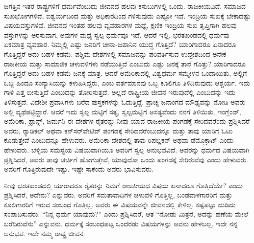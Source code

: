 \newpage

ಜಗತ್ತಿನ ಇತರ ರಾಷ್ಟ್ರಗಳಿಗೆ ಧರ್ಮವೆಂಬುದು ಜೀವನದ ಹಲವು ಕಸುಬುಗಳಲ್ಲಿ ಒಂದು. ರಾಜಕೀಯವಿದೆ, ಸಮಾಜದ ಸುಖಭೋಗಗಳಿವೆ, ಐಶ್ವರ್ಯದಿಂದ ಮತ್ತು ಅಧಿಕಾರದಿಂದ ಗಳಿಸುವುದು ಎಷ್ಟೋ ಇವೆ. ಇಂದ್ರಿಯ ಸುಖಕ್ಕೆ ಬೇಕಾದಷ್ಟು ವಿಷಯವಸ್ತುಗಳಿವೆ. ಜೀವನದ ಇಂತಹ ಹಲವು ವ್ಯವಹಾರಗಳ ಮಧ್ಯೆ, ಕ್ಷಣಿಕ ಇಂದ್ರಿಯ ಸುಖ ತೃಪ್ತಿಗಾಗಿ ಹಲವು ವಸ್ತುಗಳನ್ನು ಅರಸುವಾಗ, ಅವುಗಳ ಮಧ್ಯೆ ಸ್ವಲ್ಪ ಧರ್ಮವೂ ಇದೆ. ಆದರೆ ಇಲ್ಲಿ, ಭರತಖಂಡದಲ್ಲಿ ಧರ್ಮವು ಏಕಮಾತ್ರ ವ್ಯವಹಾರ. ನಿಮ್ಮಲ್ಲಿ ಎಷ್ಟು ಜನರಿಗೆ ಚೀನಾ-ಜಪಾನಿನ ಯುದ್ಧ ಗೊತ್ತಿದೆ? ಯಾರಿಗಾದರೂ ಏನಾದರೂ ಗೊತ್ತಿದ್ದರೆ ಅದು ಬಹಳ ಕಡಮೆ. ಪಶ್ಚಿಮ ದೇಶಗಳಲ್ಲಿ ಸಮಾಜವನ್ನು ಪರಿವರ್ತಿಸುವ ಉದ್ದೇಶದಿಂದ ಅನೇಕ ರಾಜಕೀಯ ಮತ್ತು ಸಾಮಾಜಿಕ ಚಳುವಳಿಗಳು ನಡೆಯುತ್ತಿವೆ ಎಂಬುದು ಎಷ್ಟು ಜನಕ್ಕೆ ತಾನೆ ಗೊತ್ತು? ಯಾರಿಗಾದರೂ ಗೊತ್ತಿದ್ದರೆ ಅದು ಬಹಳ ಕಡಮೆ ಜನಕ್ಕೆ ಮಾತ್ರ. ಆದರೆ ಅಮೆರಿಕಾದಲ್ಲಿ ವಿಶ್ವಧರ್ಮ ಸಮ್ಮೇಳನ ಒಂದಾಯಿತು, ಅಲ್ಲಿಗೆ ಒಬ್ಬ ಹಿಂದೂ ಸಂನ್ಯಾಸಿಯನ್ನು ಕಳುಹಿಸಿದ್ದರು, ಎಂಬ ವರ್ತಮಾನವು ಒಬ್ಬ ಕೂಲಿಗೂ ತಿಳಿದಿರುವುದು ಆಶ್ಚರ್ಯ. ಇದು ಗಾಳಿ ಎತ್ತ ಬೀಸುತ್ತಿದೆ ಎಂಬುದನ್ನು ತೋರಿಸುತ್ತದೆ. ಅಲ್ಲದೆ ರಾಷ್ಟ್ರೀಯ ಜೀವನ ಇರುವುದೆಲ್ಲಿ ಎಂಬುದನ್ನು ಇದು ತಿಳಿಸುತ್ತದೆ. ವಿದೇಶೀ ಪ್ರವಾಸಿಗಳು ಬರೆದ ಪುಸ್ತಕಗಳನ್ನು ಓದುತ್ತಿದ್ದೆ. ಪ್ರಾಚ್ಯ ಜನಾಂಗದ ಮೌಢ್ಯವನ್ನು ನೋಡಿ ಅವರು ಅಲ್ಲಿ ವ್ಯಥೆಪಟ್ಟಿದ್ದಾರೆ. ಆದರೆ ಇದು ಸ್ವಲ್ಪ ಮಟ್ಟಿಗೆ ಸತ್ಯ, ಸ್ವಲ್ಪಮಟ್ಟಿಗೆ ಅಸತ್ಯವೆಂದು ನನಗೆ ತಿಳಿಯಿತು. ಇಂಗ್ಲೆಂಡ್​, ಅಮೆರಿಕಾ, ಫ್ರಾನ್ಸ್, ಜರ್ಮನಿ-ಈ ದೇಶಗಳ ರೈತರನ್ನು ನೀವು ಯಾವ ರಾಜಕೀಯ ಪಂಗಡಕ್ಕೆ ಸೇರಿದವರೆಂದು ಪ್ರಶ್ನಿಸಿದರೆ ಅವರು, ರ‌್ಯಾಡಿಕಲ್​ ಅಥವಾ ಕನ್​ಸರ್​ವೇಟಿವ್​ ಪಂಗಡಕ್ಕೆ ಸೇರಿದವರೆಂಬುದನ್ನೂ ಮತ್ತು ತಾವು ಯಾರಿಗೆ ಓಟು ಕೊಡುತ್ತೇವೆ ಎಂಬುದನ್ನೂ ಹೇಳುವರು. ಅಮೆರಿಕಾ ದೇಶದಲ್ಲಿ ತಾವು ರಿಪಬ್ಲಿಕನ್​ ಅಥವಾ ಡೆಮೊಕ್ರಾಟ್​ ಎಂದು ಹೇಳುವರು. ಬೆಳ್ಳಿಯ ಸಮಸ್ಯೆಯ ವಿಷಯವಾಗಿಯೂ ಅವರಿಗೆ ಸ್ವಲ್ಪ ಅನುಭವವಿದೆ. ಅವರನ್ನು ಧರ್ಮದ ವಿಷಯವಾಗಿ ಪ್ರಶ್ನಿಸಿದರೆ, ಅವರು ತಾವು ಚರ್ಚಿಗೆ ಹೋಗುತ್ತೇವೆ, ಯಾವುದೋ ಒಂದು ಪಂಗಡಕ್ಕೆ ಸೇರಿರುವೆವು ಎಂದು ಹೇಳುವರು. ಅವರಿಗೆ ಗೊತ್ತಿರುವುದೇ ಇಷ್ಟು. ಇಷ್ಟೇ ಸಾಕೆಂದು ಅವರು ಭಾವಿಸುವರು.

ನೀವು ಭರತಖಂಡದಲ್ಲಿ ಯಾರಾದರೂ ರೈತರನ್ನು ನಿಮಗೆ ರಾಜಕೀಯದ ವಿಷಯ ಏನಾದರೂ ಗೊತ್ತಿದೆಯೇ? ಎಂದು ಪ್ರಶ್ನಿಸಿದರೆ, ಅದೇನು? ಎನ್ನುವರು. ಅವರಿಗೆ ಸಮತಾವಾದಿಗಳ ಚಳುವಳಿ ಗೊತ್ತಿಲ್ಲ, ಬಂಡವಾಳಗಾರರಿಗೆ ಮತ್ತು ಕೂಲಿಗಾರರಿಗೆ ಇರುವ ಸಂಬಂಧ ಗೊತ್ತಿಲ್ಲ. ಅವರು ಈ ವಿಷಯವನ್ನೇ ಜೀವನದಲ್ಲಿ ಕೇಳಿಲ್ಲ. ಕಷ್ಟಪಟ್ಟು ದುಡಿದು ಸಂಪಾದಿಸುವರು. “ನಿನ್ನ ಧರ್ಮ ಯಾವುದು?” ಎಂದು ಪ್ರಶ್ನಿಸಿದರೆ, ಆತ “ನೋಡು ಮಿತ್ರನೆ, ಅದನ್ನು ಹಣೆಯ ಮೇಲೆ ಬರೆದಿರುವೆನು” ಎನ್ನುವನು. ಧರ್ಮಕ್ಕೆ ಸಂಬಂಧಪಟ್ಟ ಒಂದೆರಡು ವಿಷಯಗಳನ್ನು ಅವನು ಹೇಳಬಲ್ಲ. ಇದೇ ನನ್ನ ಅನುಭವ. ಇದೇ ನಮ್ಮ ರಾಷ್ಟ್ರ ಜೀವನ.

